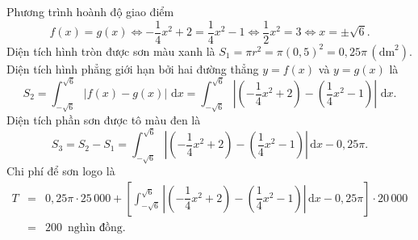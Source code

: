 \begin{bt}
{		Phương trình  hoành độ giao điểm $$f(x)=g(x)\Leftrightarrow-\dfrac{1}{4}x^2+2=\dfrac{1}{4}x^2-1\Leftrightarrow \dfrac{1}{2}x^2=3\Leftrightarrow x=\pm \sqrt{6}.$$
		Diện tích hình tròn được  sơn màu xanh là $S_1=\pi r^2=\pi(0{,}5)^2=0{,}25\pi\,\left(\text{dm}^2\right)$.\\
		 Diện tích hình phẳng giới hạn bởi hai đường thẳng $y=f(x)$ và $y=g(x)$ là
		 \[S_2=\displaystyle\int^{\sqrt{6}}_{-\sqrt{6}}|f(x)-g(x)|\,\mathrm{\,d}x=\displaystyle\int^{\sqrt{6}}_{-\sqrt{6}}\left|\left(-\dfrac{1}{4}x^2+2\right)-\left(\dfrac{1}{4}x^2-1\right)\right|\,\mathrm{\,d}x.\]
		 Diện tích phần sơn được tô màu đen là $$S_3=S_2-S_1=\displaystyle\int^{\sqrt{6}}_{-\sqrt{6}}\left|\left(-\dfrac{1}{4}x^2+2\right)-\left(\dfrac{1}{4}x^2-1\right)\right|\mathrm{\,d}x-0{,}25\pi.$$
		Chi phí để sơn logo là 
		 \allowdisplaybreaks
		\begin{eqnarray*}
			 T&=&0{,}25\pi\cdot 25\,000+\left[\displaystyle\int^{\sqrt{6}}_{-\sqrt{6}}\left| \left(-\dfrac{1}{4}x^2+2\right)-\left(\dfrac{1}{4}x^2-1\right)\right|\mathrm{\,d}x-0{,}25\pi\right]\cdot 20\,000\\
			&=&200 \,\text{ nghìn  đồng}.
		\end{eqnarray*}
	} 
\end{bt}

